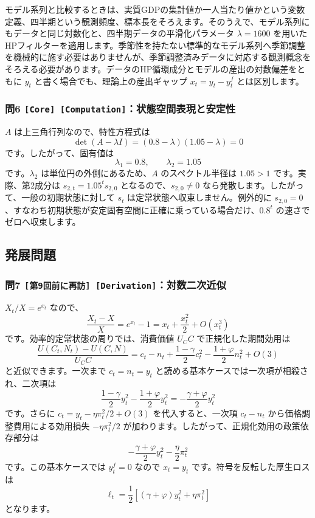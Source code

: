 \documentclass[
  japanese,
  lualatex,
  ja=standard,
  11pt,
  a4paper]{ltjsarticle}
\begin{document}
モデル系列と比較するときは、実質GDPの集計値か一人当たり値かという変数定義、四半期という観測頻度、標本長をそろえます。そのうえで、モデル系列にもデータと同じ対数化と、四半期データの平滑化パラメータ
\(\lambda=1600\)
を用いたHPフィルターを適用します。季節性を持たない標準的なモデル系列へ季節調整を機械的に施す必要はありませんが、季節調整済みデータに対応する観測概念をそろえる必要があります。データのHP循環成分とモデルの産出の対数偏差をともに
\(y_t\) と書く場合でも、理論上の産出ギャップ \(x_t=y_t-y_t^f\)
とは区別します。

\subsubsection{\texorpdfstring{問6
\texttt{{[}Core{]}\ {[}Computation{]}}：状態空間表現と安定性}{問6 {[}Core{]} {[}Computation{]}：状態空間表現と安定性}}\label{ux554f6-core-computationux72b6ux614bux7a7aux9593ux8868ux73feux3068ux5b89ux5b9aux6027}

\(A\) は上三角行列なので、特性方程式は \[
\det(A-\lambda I)
=(0.8-\lambda)(1.05-\lambda)=0
\] です。したがって、固有値は \[
\lambda_1=0.8,
\qquad
\lambda_2=1.05
\] です。\(\lambda_2\) は単位円の外側にあるため、\(A\)
のスペクトル半径は \(1.05>1\) です。実際、第2成分は
\(s_{2,t}=1.05^t s_{2,0}\) となるので、\(s_{2,0}\neq0\)
なら発散します。したがって、一般の初期状態に対して \(s_t\)
は定常状態へ収束しません。例外的に
\(s_{2,0}=0\)、すなわち初期状態が安定固有空間に正確に乗っている場合だけ、\(0.8^t\)
の速さでゼロへ収束します。

\clearpage

\subsection{発展問題}\label{ux767aux5c55ux554fux984c-1}

\subsubsection{\texorpdfstring{問7
\texttt{{[}第9回前に再訪{]}\ {[}Derivation{]}}：対数二次近似}{問7 {[}第9回前に再訪{]} {[}Derivation{]}：対数二次近似}}\label{ux554f7-ux7b2c9ux56deux524dux306bux518dux8a2a-derivationux5bfeux6570ux4e8cux6b21ux8fd1ux4f3c}

\(X_t/X=e^{x_t}\) なので、 \[
\frac{X_t-X}{X}=e^{x_t}-1
=x_t+\frac{x_t^2}{2}+O(x_t^3)
\] です。効率的定常状態の周りでは、消費価値 \(U_C C\)
で正規化した期間効用は \[
\frac{U(C_t,N_t)-U(C,N)}{U_C C}
=c_t-n_t
+\frac{1-\gamma}{2}c_t^2
-\frac{1+\varphi}{2}n_t^2
+O(3)
\] と近似できます。一次まで \(c_t=n_t=y_t\)
と読める基本ケースでは一次項が相殺され、二次項は \[
\frac{1-\gamma}{2}y_t^2
-\frac{1+\varphi}{2}y_t^2
=-\frac{\gamma+\varphi}{2}y_t^2
\] です。さらに \(c_t=y_t-\eta\pi_t^2/2+O(3)\) を代入すると、一次項
\(c_t-n_t\) から価格調整費用による効用損失 \(-\eta\pi_t^2/2\)
が加わります。したがって、正規化効用の政策依存部分は \[
-\frac{\gamma+\varphi}{2}y_t^2
-\frac{\eta}{2}\pi_t^2
\] です。この基本ケースでは \(y_t^f=0\) なので \(x_t=y_t\)
です。符号を反転した厚生ロスは \[
\ell_t
=\frac12\left[(\gamma+\varphi)y_t^2+\eta\pi_t^2\right]
\] となります。
\end{document}
